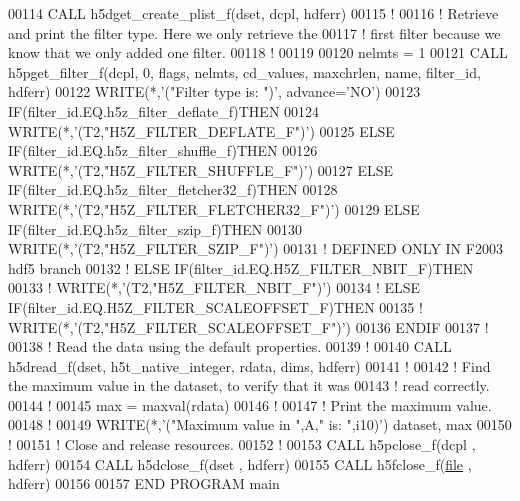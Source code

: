 \begin{DoxyCode}
00114   \textcolor{keyword}{CALL }h5dget\_create\_plist\_f(dset, dcpl, hdferr)
00115   \textcolor{comment}{!}
00116   \textcolor{comment}{! Retrieve and print the filter type.  Here we only retrieve the}
00117   \textcolor{comment}{! first filter because we know that we only added one filter.}
00118   \textcolor{comment}{!}
00119   
00120   nelmts = 1
00121   \textcolor{keyword}{CALL }h5pget\_filter\_f(dcpl, 0, flags, nelmts, cd\_values, maxchrlen, name, filter\_id, hdferr)
00122   \textcolor{keyword}{WRITE}(*,\textcolor{stringliteral}{'("Filter type is: ")'}, advance=\textcolor{stringliteral}{'NO'})
00123   \textcolor{keywordflow}{IF}(filter\_id.EQ.h5z\_filter\_deflate\_f)\textcolor{keywordflow}{THEN}
00124      \textcolor{keyword}{WRITE}(*,\textcolor{stringliteral}{'(T2,"H5Z\_FILTER\_DEFLATE\_F")'})
00125   \textcolor{keywordflow}{ELSE} \textcolor{keywordflow}{IF}(filter\_id.EQ.h5z\_filter\_shuffle\_f)\textcolor{keywordflow}{THEN}
00126      \textcolor{keyword}{WRITE}(*,\textcolor{stringliteral}{'(T2,"H5Z\_FILTER\_SHUFFLE\_F")'})
00127   \textcolor{keywordflow}{ELSE} \textcolor{keywordflow}{IF}(filter\_id.EQ.h5z\_filter\_fletcher32\_f)\textcolor{keywordflow}{THEN}
00128      \textcolor{keyword}{WRITE}(*,\textcolor{stringliteral}{'(T2,"H5Z\_FILTER\_FLETCHER32\_F")'})
00129   \textcolor{keywordflow}{ELSE} \textcolor{keywordflow}{IF}(filter\_id.EQ.h5z\_filter\_szip\_f)\textcolor{keywordflow}{THEN}
00130      \textcolor{keyword}{WRITE}(*,\textcolor{stringliteral}{'(T2,"H5Z\_FILTER\_SZIP\_F")'})
00131 \textcolor{comment}{! DEFINED ONLY IN F2003 hdf5 branch}
00132 \textcolor{comment}{!  ELSE IF(filter\_id.EQ.H5Z\_FILTER\_NBIT\_F)THEN}
00133 \textcolor{comment}{!     WRITE(*,'(T2,"H5Z\_FILTER\_NBIT\_F")')}
00134 \textcolor{comment}{!  ELSE IF(filter\_id.EQ.H5Z\_FILTER\_SCALEOFFSET\_F)THEN}
00135 \textcolor{comment}{!     WRITE(*,'(T2,"H5Z\_FILTER\_SCALEOFFSET\_F")')}
00136 \textcolor{keywordflow}{  ENDIF}
00137   \textcolor{comment}{!}
00138   \textcolor{comment}{! Read the data using the default properties.}
00139   \textcolor{comment}{!}
00140   \textcolor{keyword}{CALL }h5dread\_f(dset, h5t\_native\_integer, rdata, dims, hdferr)
00141   \textcolor{comment}{!}
00142   \textcolor{comment}{! Find the maximum value in the dataset, to verify that it was}
00143   \textcolor{comment}{! read correctly.}
00144   \textcolor{comment}{!}
00145   max = maxval(rdata)
00146   \textcolor{comment}{!}
00147   \textcolor{comment}{! Print the maximum value.}
00148   \textcolor{comment}{!}
00149   \textcolor{keyword}{WRITE}(*,\textcolor{stringliteral}{'("Maximum value in ",A," is: ",i10)'}) dataset, max
00150   \textcolor{comment}{!}
00151   \textcolor{comment}{! Close and release resources.}
00152   \textcolor{comment}{!}
00153   \textcolor{keyword}{CALL }h5pclose\_f(dcpl , hdferr)
00154   \textcolor{keyword}{CALL }h5dclose\_f(dset , hdferr)
00155   \textcolor{keyword}{CALL }h5fclose\_f(\hyperlink{structfile}{file} , hdferr)
00156 
00157 \textcolor{keyword}{END PROGRAM }main
\end{DoxyCode}

